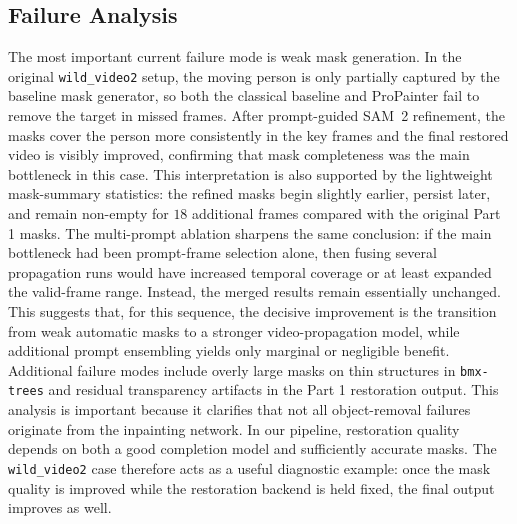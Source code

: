 \documentclass[10pt,twocolumn,letterpaper]{article}
\begin{document}
\subsection{Failure Analysis}
The most important current failure mode is weak mask generation.
In the original \texttt{wild\_video2} setup, the moving person is only partially captured by the baseline mask generator, so both the classical baseline and ProPainter fail to remove the target in missed frames.
After prompt-guided SAM~2 refinement, the masks cover the person more consistently in the key frames and the final restored video is visibly improved, confirming that mask completeness was the main bottleneck in this case.
This interpretation is also supported by the lightweight mask-summary statistics: the refined masks begin slightly earlier, persist later, and remain non-empty for $18$ additional frames compared with the original Part 1 masks.
The multi-prompt ablation sharpens the same conclusion: if the main bottleneck had been prompt-frame selection alone, then fusing several propagation runs would have increased temporal coverage or at least expanded the valid-frame range.
Instead, the merged results remain essentially unchanged.
This suggests that, for this sequence, the decisive improvement is the transition from weak automatic masks to a stronger video-propagation model, while additional prompt ensembling yields only marginal or negligible benefit.
Additional failure modes include overly large masks on thin structures in \texttt{bmx-trees} and residual transparency artifacts in the Part 1 restoration output.
This analysis is important because it clarifies that not all object-removal failures originate from the inpainting network.
In our pipeline, restoration quality depends on both a good completion model and sufficiently accurate masks.
The \texttt{wild\_video2} case therefore acts as a useful diagnostic example: once the mask quality is improved while the restoration backend is held fixed, the final output improves as well.
\end{document}
